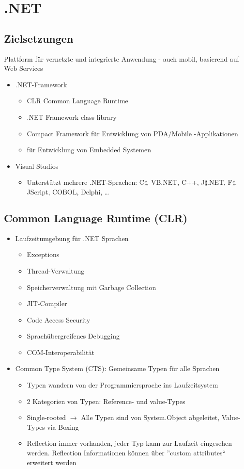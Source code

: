 \section{.NET}
\subsection{Zielsetzungen}
Plattform für vernetzte und integrierte Anwendung - auch mobil, basierend auf Web Services
\begin{itemize}
  \item .NET-Framework
		\begin{itemize}
		\item CLR Common Language Runtime
		\item .NET Framework class library
		\item Compact Framework für Entwicklung von PDA/Mobile -Applikationen
		\item {} für Entwicklung von Embedded Systemen
	\end{itemize}
	\item  Visual Studios
	\begin{itemize}
  	\item Unterstützt mehrere .NET-Sprachen: C$\sharp$, VB.NET, C++, J$\sharp$.NET, F$\sharp$, JScript, COBOL, Delphi, \dots	
	\end{itemize}
\end{itemize}

\subsection{Common Language Runtime (CLR)}
\begin{itemize}
	\item Laufzeitumgebung für .NET Sprachen
		\begin{itemize}
			\item Exceptions
			\item Thread-Verwaltung
			\item Speicherverwaltung mit Garbage Collection
			\item JIT-Compiler
			\item Code Access Security
			\item Sprachübergreifenes Debugging
			\item COM-Interoperabilität
		\end{itemize}
	\item Common Type System (CTS): Gemeinsame Typen für alle Sprachen
		\label{csharpCTS}
		\begin{itemize}
			\item Typen wandern von der Programmiersprache ins Laufzeitsystem
			\item 2 Kategorien von Typen: Reference- und value-Types
			\item Single-rooted $\rightarrow$ Alle Typen sind von System.Object abgeleitet, Value-Types via Boxing
			\item Reflection immer vorhanden, jeder Typ kann zur Laufzeit eingesehen werden.
				Reflection Informationen können über ''custom attributes`` erweitert werden
		\end{itemize}
\end{itemize}


